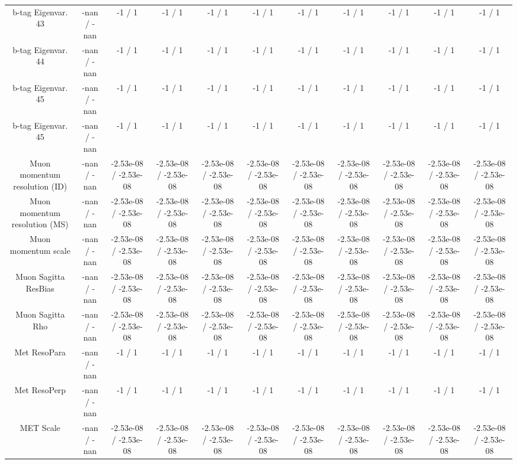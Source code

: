 \begin{table}[htbp]
\begin{center}
\begin{tabular}{|c|c|c|c|c|c|c|c|c|c|c|}
  b-tag Eigenvar. 43 & -nan / -nan & -1 / 1 & -1 / 1 & -1 / 1 & -1 / 1 & -1 / 1 & -1 / 1 & -1 / 1 & -1 / 1 & -1 / 1 \\ 
  b-tag Eigenvar. 44 & -nan / -nan & -1 / 1 & -1 / 1 & -1 / 1 & -1 / 1 & -1 / 1 & -1 / 1 & -1 / 1 & -1 / 1 & -1 / 1 \\ 
  b-tag Eigenvar. 45 & -nan / -nan & -1 / 1 & -1 / 1 & -1 / 1 & -1 / 1 & -1 / 1 & -1 / 1 & -1 / 1 & -1 / 1 & -1 / 1 \\ 
  b-tag Eigenvar. 45 & -nan / -nan & -1 / 1 & -1 / 1 & -1 / 1 & -1 / 1 & -1 / 1 & -1 / 1 & -1 / 1 & -1 / 1 & -1 / 1 \\ 
  Muon momentum resolution (ID) & -nan / -nan & -2.53e-08 / -2.53e-08 & -2.53e-08 / -2.53e-08 & -2.53e-08 / -2.53e-08 & -2.53e-08 / -2.53e-08 & -2.53e-08 / -2.53e-08 & -2.53e-08 / -2.53e-08 & -2.53e-08 / -2.53e-08 & -2.53e-08 / -2.53e-08 & -2.53e-08 / -2.53e-08 \\ 
  Muon momentum resolution (MS) & -nan / -nan & -2.53e-08 / -2.53e-08 & -2.53e-08 / -2.53e-08 & -2.53e-08 / -2.53e-08 & -2.53e-08 / -2.53e-08 & -2.53e-08 / -2.53e-08 & -2.53e-08 / -2.53e-08 & -2.53e-08 / -2.53e-08 & -2.53e-08 / -2.53e-08 & -2.53e-08 / -2.53e-08 \\ 
  Muon momentum scale & -nan / -nan & -2.53e-08 / -2.53e-08 & -2.53e-08 / -2.53e-08 & -2.53e-08 / -2.53e-08 & -2.53e-08 / -2.53e-08 & -2.53e-08 / -2.53e-08 & -2.53e-08 / -2.53e-08 & -2.53e-08 / -2.53e-08 & -2.53e-08 / -2.53e-08 & -2.53e-08 / -2.53e-08 \\ 
  Muon Sagitta ResBias & -nan / -nan & -2.53e-08 / -2.53e-08 & -2.53e-08 / -2.53e-08 & -2.53e-08 / -2.53e-08 & -2.53e-08 / -2.53e-08 & -2.53e-08 / -2.53e-08 & -2.53e-08 / -2.53e-08 & -2.53e-08 / -2.53e-08 & -2.53e-08 / -2.53e-08 & -2.53e-08 / -2.53e-08 \\ 
  Muon Sagitta Rho & -nan / -nan & -2.53e-08 / -2.53e-08 & -2.53e-08 / -2.53e-08 & -2.53e-08 / -2.53e-08 & -2.53e-08 / -2.53e-08 & -2.53e-08 / -2.53e-08 & -2.53e-08 / -2.53e-08 & -2.53e-08 / -2.53e-08 & -2.53e-08 / -2.53e-08 & -2.53e-08 / -2.53e-08 \\ 
  Met ResoPara & -nan / -nan & -1 / 1 & -1 / 1 & -1 / 1 & -1 / 1 & -1 / 1 & -1 / 1 & -1 / 1 & -1 / 1 & -1 / 1 \\ 
  Met ResoPerp & -nan / -nan & -1 / 1 & -1 / 1 & -1 / 1 & -1 / 1 & -1 / 1 & -1 / 1 & -1 / 1 & -1 / 1 & -1 / 1 \\ 
  MET Scale & -nan / -nan & -2.53e-08 / -2.53e-08 & -2.53e-08 / -2.53e-08 & -2.53e-08 / -2.53e-08 & -2.53e-08 / -2.53e-08 & -2.53e-08 / -2.53e-08 & -2.53e-08 / -2.53e-08 & -2.53e-08 / -2.53e-08 & -2.53e-08 / -2.53e-08 & -2.53e-08 / -2.53e-08 \\ 

\end{tabular}
\end{center}
\end{table}
